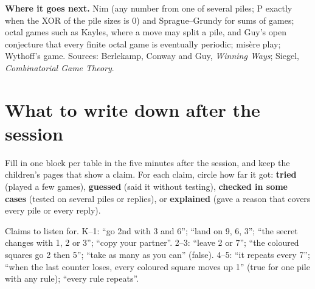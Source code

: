 \documentclass[10pt]{article}
\newcommand{\hd}{\rowcolor{head}}
\begin{document}
\textbf{Where it goes next.} Nim (any number from one of several piles; P
exactly when the XOR of the pile sizes is 0) and Sprague--Grundy for sums of
games; octal games such as Kayles, where a move may split a pile, and Guy's
open conjecture that every finite octal game is eventually periodic; misère
play; Wythoff's game. Sources: Berlekamp, Conway and Guy, \emph{Winning Ways};
Siegel, \emph{Combinatorial Game Theory}.

\newpage
\section{What to write down after the session}

Fill in one block per table in the five minutes after the session, and keep
the children's pages that show a claim. For each claim, circle how far it got:
\textbf{tried} (played a few games), \textbf{guessed} (said it without
testing), \textbf{checked in some cases} (tested on several piles or
replies), or
\textbf{explained} (gave a reason that covers every pile or every reply).

Claims to listen for. K--1: ``go 2nd with 3 and 6''; ``land on 9, 6, 3'';
``the secret changes with 1, 2 or 3''; ``copy your partner''. 2--3: ``leave 2
or 7''; ``the coloured squares go 2 then 5''; ``take as many as you can''
(false). 4--5: ``it repeats every 7''; ``when the last counter loses, every
coloured square moves up 1'' (true for one pile with any rule); ``every rule
repeats''.

\newcommand{\st}{\footnotesize tried \enspace guessed \enspace checked in some cases \enspace explained}
\newcommand{\recordblock}[2]{%
\textbf{#1}\par
\vspace{2pt}
#2\par
\vspace{4pt}
\noindent\begin{tabularx}{\linewidth}{@{}Xl@{}}
\toprule
\hd What a child tried, said or claimed (who) & How far it got (circle) \\
\midrule
\rule{0pt}{17pt} & \st \\ \arrayrulecolor{rule}\midrule
\rule{0pt}{17pt} & \st \\ \midrule
\rule{0pt}{17pt} & \st \\ \arrayrulecolor{black}\bottomrule
\end{tabularx}\par
\vspace{6pt}
A drawing or claim worth keeping:\par
\vspace{18pt}\hrule\vspace{12pt}}
\end{document}
